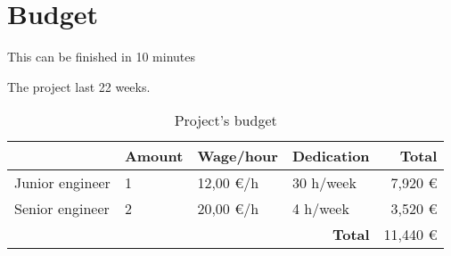 \chapter{Budget}

This can be finished in 10 minutes

The project last 22 weeks.

\begin{table}[h]
\centering
\begin{tabular}{|l|l|l|l|r|} 
\hline
 & \textbf{Amount} & \textbf{Wage/hour} & \textbf{Dedication} & \textbf{Total}  \\ [0.5ex]
\hline
Junior engineer & 1  & 12,00 \euro /h & 30 h/week & 7,920 \euro \\
\hline
Senior engineer & 2 & 20,00 \euro /h  & 4 h/week & 3,520 \euro \\
\hline
 \multicolumn{4}{|r|}{\textbf{Total}} & 11,440 \euro \\
\hline
\end{tabular}
\caption{Project's budget}
\end{table}